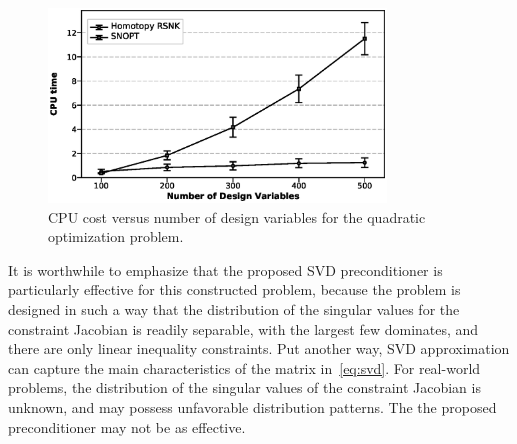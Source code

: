 \begin{figure}[tbp]
  \centering
  \includegraphics[clip,width=0.8\textwidth]{./figs/chap4_test/quadratic_random_100_nocolor.eps}%
  \caption{CPU cost versus number of design variables for the quadratic
    optimization problem.\label{fig:quad_scale}}
\end{figure}

It is worthwhile to emphasize that the proposed SVD preconditioner is particularly effective for this constructed problem, because the problem is designed in such a way that the distribution of the singular values for the constraint Jacobian is readily separable, with the largest few dominates, and there are only linear inequality constraints. Put another way, SVD approximation can capture the main characteristics of the matrix in~\eqref{eq:svd}. For real-world problems, the distribution of the singular values of the constraint Jacobian is unknown, and may possess unfavorable distribution patterns. The the proposed preconditioner may not be as effective.  




